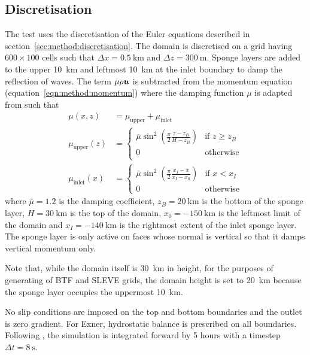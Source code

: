 \subsection{Discretisation}
The test uses the discretisation of the Euler equations described in section~\ref{sec:method:discretisation}.  The domain is discretised on a grid having $600 \times 100$ cells such that $\Delta x = \SI{0.5}{\kilo\meter}$ and $\Delta z = \SI{300}{\meter}$.  Sponge layers are added to the upper \SI{10}{\kilo\meter} and leftmost \SI{10}{\kilo\meter} at the inlet boundary to damp the reflection of waves.
The term $\mu \rho \bm{u}$ is subtracted from the momentum equation (equation~\ref{eqn:method:momentum}) where the damping function $\mu$ is adapted from \textcite{melvin2010} such that
\begin{align}
	\mu(x, z) &= \mu_\mathrm{upper} + \mu_\mathrm{inlet} \\
	\mu_\mathrm{upper}(z) &= \begin{cases}
		\overline{\mu} \sin^2 \left( \frac{\pi}{2} \frac{z - z_B}{H - z_B} \right) & \text{if } z \geq z_B \\
		0 & \text{otherwise} \\
	\end{cases} \\
	\mu_\mathrm{inlet}(x) &= \begin{cases}
		\overline{\mu} \sin^2 \left( \frac{\pi}{2} \frac{x_I - x}{x_I - x_0} \right) & \text{if } x < x_I \\
		0 & \text{otherwise}
	\end{cases}
\end{align}
where $\overline{\mu} = 1.2$ is the damping coefficient, $z_B = \SI{20}{\kilo\meter}$ is the bottom of the sponge layer, $H = \SI{30}{\kilo\meter}$ is the top of the domain, $x_0 = \SI{-150}{\kilo\meter}$ is the leftmost limit of the domain and $x_I = \SI{-140}{\kilo\meter}$ is the rightmost extent of the inlet sponge layer.  The sponge layer is only active on faces whose normal is vertical so that it damps vertical momentum only.

Note that, while the domain itself is \SI{30}{\kilo\meter} in height, for the purposes of generating of BTF and SLEVE grids, the domain height is set to \SI{20}{\kilo\meter} because the sponge layer occupies the uppermost \SI{10}{\kilo\meter}.

No slip conditions are imposed on the top and bottom boundaries and the outlet is zero gradient.  For Exner, hydrostatic balance is prescribed on all boundaries.  Following \textcite{melvin2010}, the simulation is integrated forward by 5 hours with a timestep $\Delta t = \SI{8}{\second}$.

